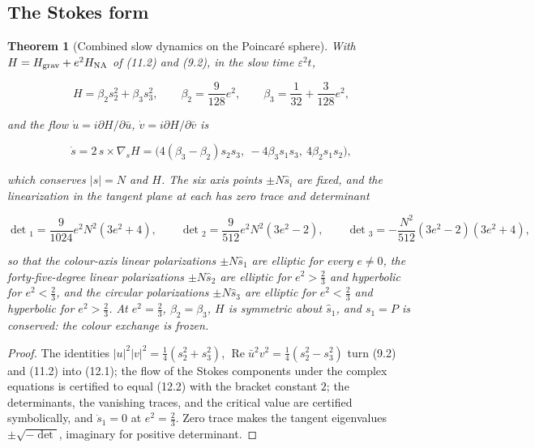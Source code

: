 \documentclass[11pt]{article}
\newtheorem{theorem}{Theorem}[section]
\theoremstyle{remark}
\begin{document}
\subsection{The Stokes form}

\begin{theorem}[Combined slow dynamics on the Poincar\'e sphere]
\label{thm:v20v9-stokes}
With \(H=H_{\rm grav}+e^2H_{\rm NA}\) of (11.2) and (9.2), in the slow
time \(\varepsilon^2t\),

\[
 H=\beta_2s_2^2+\beta_3s_3^2,\qquad \beta_2=\frac9{128}e^2,\qquad
 \beta_3=\frac1{32}+\frac3{128}e^2,                                     \tag{12.1}
\]

and the flow \(\dot u=i\partial H/\partial\bar u\), \(\dot v=i\partial H/\partial\bar v\)
is

\[
 \dot s=2\,s\times\nabla_sH=\bigl(4(\beta_3-\beta_2)s_2s_3,\ -4\beta_3s_1s_3,\ 4\beta_2s_1s_2\bigr),
                                                                    \tag{12.2}
\]

which conserves \(|s|=N\) and \(H\).  The six axis points \(\pm N\hat s_i\)
are fixed, and the linearization in the tangent plane at each has
zero trace and determinant

\[
 \det{}_1=\frac9{1024}e^2N^2(3e^2+4),\qquad
 \det{}_2=\frac9{512}e^2N^2(3e^2-2),\qquad
 \det{}_3=-\frac{N^2}{512}(3e^2-2)(3e^2+4),                             \tag{12.3}
\]

so that the colour-axis linear polarizations \(\pm N\hat s_1\) are
elliptic for every \(e\neq0\), the forty-five-degree linear
polarizations \(\pm N\hat s_2\) are elliptic for \(e^2>\tfrac23\) and
hyperbolic for \(e^2<\tfrac23\), and the circular polarizations
\(\pm N\hat s_3\) are elliptic for \(e^2<\tfrac23\) and hyperbolic for
\(e^2>\tfrac23\).  At \(e^2=\tfrac23\), \(\beta_2=\beta_3\), \(H\) is
symmetric about \(\hat s_1\), and \(s_1=P\) is conserved: the colour
exchange is frozen.
\end{theorem}

\begin{proof}
The identities \(|u|^2|v|^2=\tfrac14(s_2^2+s_3^2)\),
\(\operatorname{Re}\bar u^2v^2=\tfrac14(s_2^2-s_3^2)\) turn (9.2) and
(11.2) into (12.1); the flow of the Stokes components under the
complex equations is certified to equal (12.2) with the bracket
constant \(2\); the determinants, the vanishing traces, and the
critical value are certified symbolically, and \(\dot s_1=0\) at
\(e^2=\tfrac23\).  Zero trace makes the tangent eigenvalues
\(\pm\sqrt{-\det}\), imaginary for positive determinant.
\end{proof}
\end{document}
